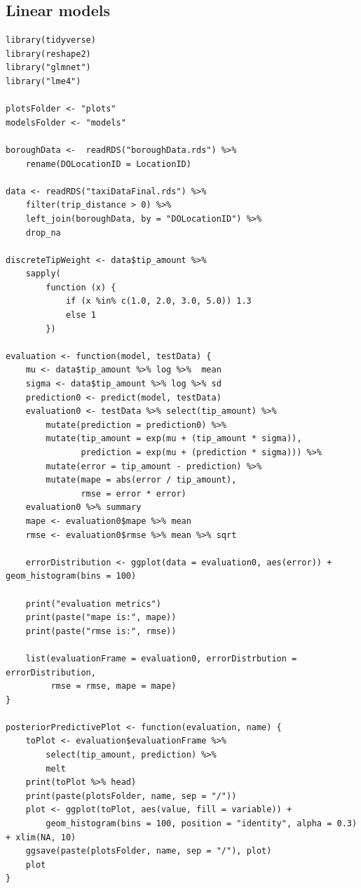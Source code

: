 \documentclass[11pt]{article}
\begin{document}
\subsection{Linear models}
\label{sec:orgcfea1f5}
\begin{verbatim}
library(tidyverse)
library(reshape2)
library("glmnet")
library("lme4")

plotsFolder <- "plots"
modelsFolder <- "models"

boroughData <-  readRDS("boroughData.rds") %>%
    rename(DOLocationID = LocationID)

data <- readRDS("taxiDataFinal.rds") %>%
    filter(trip_distance > 0) %>%
    left_join(boroughData, by = "DOLocationID") %>%
    drop_na

discreteTipWeight <- data$tip_amount %>%
    sapply(
        function (x) {
            if (x %in% c(1.0, 2.0, 3.0, 5.0)) 1.3
            else 1
        })

evaluation <- function(model, testData) {
    mu <- data$tip_amount %>% log %>%  mean
    sigma <- data$tip_amount %>% log %>% sd
    prediction0 <- predict(model, testData)
    evaluation0 <- testData %>% select(tip_amount) %>%
        mutate(prediction = prediction0) %>%
        mutate(tip_amount = exp(mu + (tip_amount * sigma)),
               prediction = exp(mu + (prediction * sigma))) %>%
        mutate(error = tip_amount - prediction) %>%
        mutate(mape = abs(error / tip_amount),
               rmse = error * error)
    evaluation0 %>% summary
    mape <- evaluation0$mape %>% mean
    rmse <- evaluation0$rmse %>% mean %>% sqrt

    errorDistribution <- ggplot(data = evaluation0, aes(error)) + geom_histogram(bins = 100)

    print("evaluation metrics")
    print(paste("mape is:", mape))
    print(paste("rmse is:", rmse))

    list(evaluationFrame = evaluation0, errorDistrbution = errorDistribution,
         rmse = rmse, mape = mape)
}

posteriorPredictivePlot <- function(evaluation, name) {
    toPlot <- evaluation$evaluationFrame %>%
        select(tip_amount, prediction) %>%
        melt
    print(toPlot %>% head)
    print(paste(plotsFolder, name, sep = "/"))
    plot <- ggplot(toPlot, aes(value, fill = variable)) +
        geom_histogram(bins = 100, position = "identity", alpha = 0.3) + xlim(NA, 10)
    ggsave(paste(plotsFolder, name, sep = "/"), plot)
    plot
}


\end{verbatim}
\end{document}
